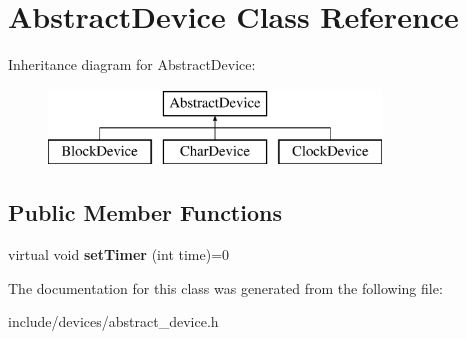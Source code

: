 \hypertarget{classAbstractDevice}{\section{\-Abstract\-Device \-Class \-Reference}
\label{db/d0e/classAbstractDevice}
}
\-Inheritance diagram for \-Abstract\-Device\-:\begin{figure}[H]
\begin{center}
\leavevmode
\includegraphics[height=2.000000cm]{db/d0e/classAbstractDevice}
\end{center}
\end{figure}
\subsection*{\-Public \-Member \-Functions}
\begin{DoxyCompactItemize}
\item 
\hypertarget{classAbstractDevice_a393c627235e10b16507161febe32cae0}{virtual void {\bfseries set\-Timer} (int time)=0}\label{db/d0e/classAbstractDevice_a393c627235e10b16507161febe32cae0}

\end{DoxyCompactItemize}


\-The documentation for this class was generated from the following file\-:\begin{DoxyCompactItemize}
\item 
include/devices/abstract\-\_\-device.\-h\end{DoxyCompactItemize}
